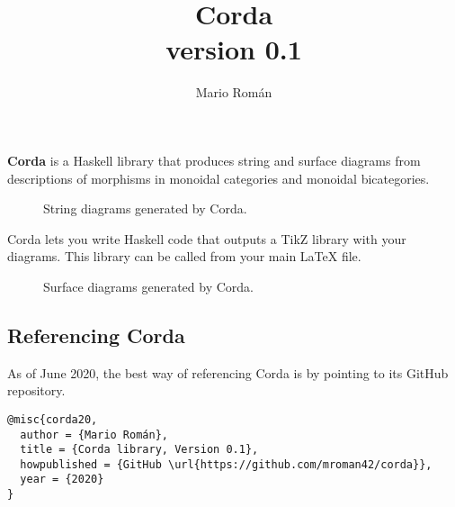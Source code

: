 \documentclass{article}
\title{Corda \\ \normalsize{\textsf{version 0.1}}}
\author{Mario Román}
\begin{document}
\maketitle

\textbf{Corda} is a Haskell library that produces string and surface diagrams from descriptions of morphisms in monoidal categories and monoidal bicategories.

\begin{figure}[h]
  \centering
  \assocOne \qquad
  \assocTwo
  \caption{String diagrams generated by Corda.}
\end{figure}

Corda lets you write Haskell code that outputs a TikZ library with your diagrams. This library can be called from your main LaTeX file.

\begin{figure}[h]
  \centering
  \associatorDiagram \quad
  \leftUnitorDiagram \quad
  \rightUnitorDiagram
  \caption{Surface diagrams generated by Corda.}
\end{figure}



\subsection*{Referencing Corda}

As of June 2020, the best way of referencing \textsf{Corda} is by pointing to its GitHub repository.

\begin{verbatim}
@misc{corda20,
  author = {Mario Román},
  title = {Corda library, Version 0.1},
  howpublished = {GitHub \url{https://github.com/mroman42/corda}},
  year = {2020}
}

\end{verbatim}
\end{document}

